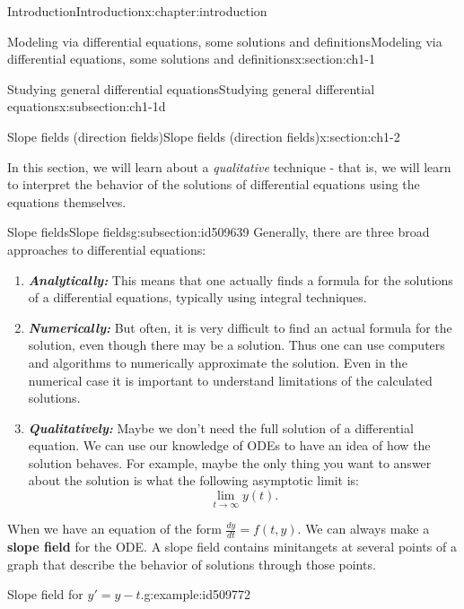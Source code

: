 \documentclass[oneside,10pt,]{book}
\newcommand{\alert}[1]{\textbf{\textit{#1}}}
\newcommand{\terminology}[1]{\textbf{#1}}
\numberwithin{equation}{section}
\numberwithin{equation}{section}
\begin{document}
\begin{chapterptx}{Introduction}{}{Introduction}{}{}{x:chapter:introduction}
\begin{sectionptx}{Modeling via differential equations, some solutions and definitions}{}{Modeling via differential equations, some solutions and definitions}{}{}{x:section:ch1-1}
\begin{subsectionptx}{Studying general differential equations}{}{Studying general differential equations}{}{}{x:subsection:ch1-1d}
\end{subsectionptx}
\end{sectionptx}
%
%
\typeout{************************************************}
\typeout{************************************************}
%
\begin{sectionptx}{Slope fields (direction fields)}{}{Slope fields (direction fields)}{}{}{x:section:ch1-2}
\begin{introduction}{}%
In this section, we will learn about a \emph{qualitative} technique - that is, we will learn to interpret the behavior of the solutions of differential equations using the equations themselves.%
\end{introduction}%
%
%
\typeout{************************************************}
\typeout{************************************************}
%
\begin{subsectionptx}{Slope fields}{}{Slope fields}{}{}{g:subsection:id509639}
Generally, there are three broad approaches to differential equations:%
\begin{enumerate}
\item{}\alert{Analytically:} This means that one actually finds a formula for the solutions of a differential equations, typically using integral techniques.%
\item{}\alert{Numerically:} But often, it is very difficult to find an actual formula for the solution, even though there may be a solution. Thus one can use computers and algorithms to numerically approximate the solution. Even in the numerical case it is important to understand limitations of the calculated solutions.%
\item{}\alert{Qualitatively:} Maybe we don't need the full solution of a differential equation. We can use our knowledge of ODEs to have an idea of how the solution behaves. For example, maybe the only thing you want to answer about the solution is what the following asymptotic limit is:%
\begin{equation*}
\lim_{t\to\infty}y(t).
\end{equation*}
%
\end{enumerate}
%
\par
When we have an equation of the form \(\frac{dy}{dt}=f(t,y)\). We can always make a \terminology{slope field} for the ODE. A slope field contains minitangets at several points of a graph that describe the behavior of solutions through those points.%
\begin{example}{Slope field for \(y' = y-t\).}{g:example:id509772}%

\end{example}
\end{subsectionptx}
\end{sectionptx}
\end{chapterptx}
\end{document}
